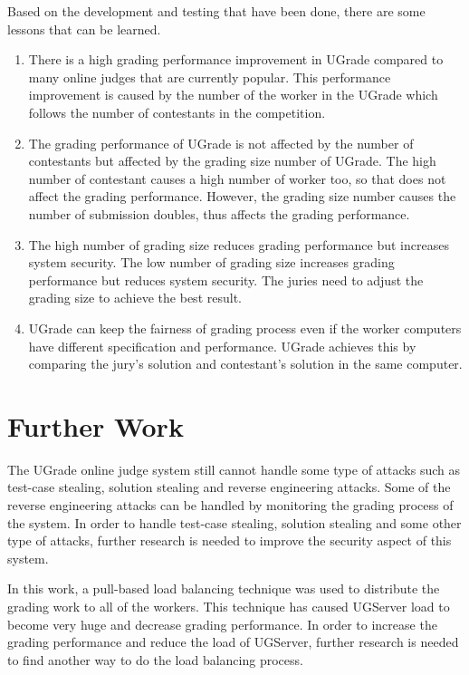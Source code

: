 \documentclass[conference,a4paper]{IEEEtran}
\begin{document}
Based on the development and testing that have been done, there are some lessons that can be learned.
\begin{enumerate}
    \item There is a high grading performance improvement in UGrade compared to many online judges that are currently popular. This performance improvement is caused by the number of the worker in the UGrade which follows the number of contestants in the competition.
    \item The grading performance of UGrade is not affected by the number of contestants but affected by the grading size number of UGrade. The high number of contestant causes a high number of worker too, so that does not affect the grading performance. However, the grading size number causes the number of submission doubles, thus affects the grading performance.
    \item The high number of grading size reduces grading performance but increases system security. The low number of grading size increases grading performance but reduces system security. The juries need to adjust the grading size to achieve the best result.
    \item UGrade can keep the fairness of grading process even if the worker computers have different specification and performance. UGrade achieves this by comparing the jury's solution and contestant's solution in the same computer.
\end{enumerate}

\section{Further Work}

The UGrade online judge system still cannot handle some type of attacks such as test-case stealing, solution stealing and reverse engineering attacks. Some of the reverse engineering attacks can be handled by monitoring the grading process of the system. In order to handle test-case stealing, solution stealing and some other type of attacks, further research is needed to improve the security aspect of this system. 

In this work, a pull-based load balancing technique was used to distribute the grading work to all of the workers. This technique has caused UGServer load to become very huge and decrease grading performance. In order to increase the grading performance and reduce the load of UGServer, further research is needed to find another way to do the load balancing process.
\end{document}
